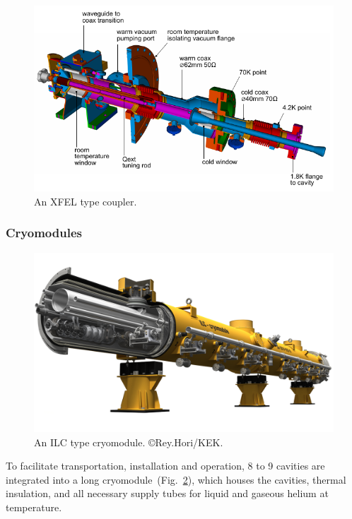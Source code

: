 \begin{figure}[htbp]
   \includegraphics[width=\hsize]{chapters/figures/xfelcoupler}
\caption{An XFEL type coupler.
}
\label{fig:xfelcoupler}
\end{figure}


\subsubsection{Cryomodules}

\begin{figure}[htbp]
   \includegraphics[width=\hsize]{chapters/figures/10_ILC_cryomodule}
\caption{An ILC type cryomodule. \copyright Rey.Hori/KEK.}
\label{fig:crymodule}
\end{figure}

To facilitate transportation, installation and operation, 8 to 9 cavities are integrated into a  long cryomodule~(Fig.~\ref{fig:crymodule}), which houses the cavities, thermal insulation, and all necessary supply tubes for liquid and gaseous helium at  temperature.


